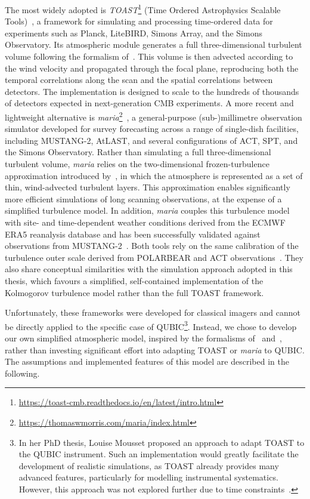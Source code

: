 \documentclass[../../thesis.tex]{subfiles}
\begin{document}
The most widely adopted is \emph{TOAST}\footnote{\url{https://toast-cmb.readthedocs.io/en/latest/intro.html}} (Time Ordered Astrophysics Scalable Tools)~\cite{TOAST}, a framework for simulating and processing time-ordered data for experiments such as Planck, LiteBIRD, Simons Array, and the Simons Observatory. Its atmospheric module generates a full three-dimensional turbulent volume following the formalism of~\cite{errard2015}. This volume is then advected according to the wind velocity and propagated through the focal plane, reproducing both the temporal correlations along the scan and the spatial correlations between detectors. The implementation is designed to scale to the hundreds of thousands of detectors expected in next-generation CMB experiments.
A more recent and lightweight alternative is \emph{maria}\footnote{\url{https://thomaswmorris.com/maria/index.html}}~\cite{maria}, a general-purpose (sub-)millimetre observation simulator developed for survey forecasting across a range of single-dish facilities, including MUSTANG-2, AtLAST, and several configurations of ACT, SPT, and the Simons Observatory. Rather than simulating a full three-dimensional turbulent volume, \emph{maria} relies on the two-dimensional frozen-turbulence approximation introduced by~\cite{morris2022}, in which the atmosphere is represented as a set of thin, wind-advected turbulent layers. This approximation enables significantly more efficient simulations of long scanning observations, at the expense of a simplified turbulence model. In addition, \emph{maria} couples this turbulence model with site- and time-dependent weather conditions derived from the ECMWF ERA5 reanalysis database and has been successfully validated against observations from MUSTANG-2~\cite{maria}.
Both tools rely on the same calibration of the turbulence outer scale derived from POLARBEAR and ACT observations~\cite{errard2015}. They also share conceptual similarities with the simulation approach adopted in this thesis, which favours a simplified, self-contained implementation of the Kolmogorov turbulence model rather than the full TOAST framework.

Unfortunately, these frameworks were developed for classical imagers and cannot be directly applied to the specific case of QUBIC\footnote{In her PhD thesis, Louise Mousset proposed an approach to adapt TOAST to the QUBIC instrument. Such an implementation would greatly facilitate the development of realistic simulations, as TOAST already provides many advanced features, particularly for modelling instrumental systematics. However, this approach was not explored further due to time constraints~\cite{thesislouise}.}. Instead, we chose to develop our own simplified atmospheric model, inspired by the formalisms of~\cite{errard2015} and~\cite{morris2022}, rather than investing significant effort into adapting TOAST or \emph{maria} to QUBIC. The assumptions and implemented features of this model are described in the following.
\end{document}

